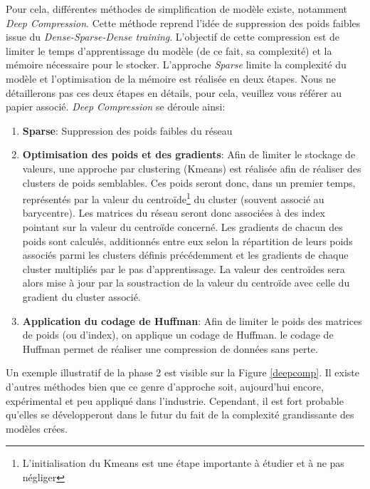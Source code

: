 \noindent Pour cela, différentes méthodes de simplification de modèle existe, notamment \textit{Deep Compression}\cite{deepcomp_deep}. Cette méthode reprend l'idée de suppression des poids faibles issue du \textit{Dense-Sparse-Dense training}. L'objectif de cette compression est de limiter le temps d'apprentissage du modèle (de ce fait, sa complexité) et la mémoire nécessaire pour le stocker. L'approche \textit{Sparse} limite la complexité du modèle et l'optimisation de la mémoire est réalisée en deux étapes. Nous ne détaillerons pas ces deux étapes en détails, pour cela, veuillez vous référer au papier associé. \textit{Deep Compression} se déroule ainsi:

\begin{enumerate}
    \item \textbf{Sparse}: Suppression des poids faibles du réseau
    \item \textbf{Optimisation des poids et des gradients}: Afin de limiter le stockage de valeurs, une approche par clustering (Kmeans) est réalisée afin de réaliser des clusters de poids semblables. Ces poids seront donc, dans un premier temps, représentés par la valeur du centroïde\footnote{L'initialisation du Kmeans est une étape importante à étudier et à ne pas négliger} du cluster (souvent associé au barycentre). Les matrices du réseau seront donc associées à des index pointant sur la valeur du centroïde concerné. Les gradients de chacun des poids sont calculés, additionnés entre eux selon la répartition de leurs poids associés parmi les clusters définis précédemment et les gradients de chaque cluster multipliés par le pas d'apprentissage. La valeur des centroïdes sera alors mise à jour par la soustraction de la valeur du centroïde avec celle du gradient du cluster associé.
    \item \textbf{Application du codage de Huffman}: Afin de limiter le poids des matrices de poids (ou d'index), on applique un codage de Huffman. le codage de Huffman permet de réaliser une compression de données sans perte.
\end{enumerate}

\noindent Un exemple illustratif de la phase 2 est visible sur la Figure \ref{deepcomp}. Il existe d'autres méthodes bien que ce genre d'approche soit, aujourd'hui encore, expérimental et peu appliqué dans l'industrie. Cependant, il est fort probable qu'elles se développeront dans le futur du fait de la complexité grandissante des modèles crées.

